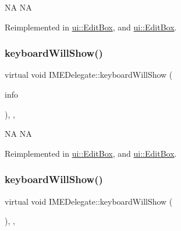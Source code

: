 NA  NA 

Reimplemented in \hyperlink{classui_1_1EditBox_aabf158a71e53e27677d85b86e9aa4e3a}{ui\+::\+Edit\+Box}, and \hyperlink{classui_1_1EditBox_afa54a7e9d06de4524963bf23565e8310}{ui\+::\+Edit\+Box}.

\mbox{\label{classIMEDelegate_ac9f4511548c15f58087d48bcb8cedbfc}} 
\subsubsection{\texorpdfstring{keyboard\+Will\+Show()}{keyboardWillShow()}\hspace{0.1cm}{\footnotesize\ttfamily [1/2]}}
{\footnotesize\ttfamily virtual void I\+M\+E\+Delegate\+::keyboard\+Will\+Show (\begin{DoxyParamCaption}\item[{\hyperlink{structIMEKeyboardNotificationInfo}{I\+M\+E\+Keyboard\+Notification\+Info} \&}]{info }\end{DoxyParamCaption})\hspace{0.3cm}{\ttfamily [inline]}, {\ttfamily [protected]}, {\ttfamily [virtual]}}

NA  NA 

Reimplemented in \hyperlink{classui_1_1EditBox_a5913b44adaf000a76cf35a126fbdeb31}{ui\+::\+Edit\+Box}, and \hyperlink{classui_1_1EditBox_abc522ffb60d7bb59404be9584fc1f60c}{ui\+::\+Edit\+Box}.

\mbox{\label{classIMEDelegate_a5e4b845087aa0946d99c39082df1d4d5}} 
\subsubsection{\texorpdfstring{keyboard\+Will\+Show()}{keyboardWillShow()}\hspace{0.1cm}{\footnotesize\ttfamily [2/2]}}
{\footnotesize\ttfamily virtual void I\+M\+E\+Delegate\+::keyboard\+Will\+Show (\begin{DoxyParamCaption}\item[{\hyperlink{structIMEKeyboardNotificationInfo}{I\+M\+E\+Keyboard\+Notification\+Info} \&}]{ }\end{DoxyParamCaption})\hspace{0.3cm}{\ttfamily [inline]}, {\ttfamily [protected]}, {\ttfamily [virtual]}}


